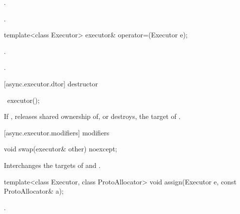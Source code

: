 \begin{itemdescr}
\pnum
\effects {}.

\pnum
\returns {}.
\end{itemdescr}

%
\begin{itemdecl}
template<class Executor> executor& operator=(Executor e);
\end{itemdecl}

\begin{itemdescr}
\pnum
\effects {}.

\pnum
\returns {}.
\end{itemdescr}



[async.executor.dtor]{ destructor}

%
\begin{itemdecl}
~executor();
\end{itemdecl}

\begin{itemdescr}
\pnum
\effects If , releases shared ownership of, or destroys, the target of .
\end{itemdescr}



[async.executor.modifiers]{ modifiers}

%
\begin{itemdecl}
void swap(executor& other) noexcept;
\end{itemdecl}

\begin{itemdescr}
\pnum
\effects Interchanges the targets of  and .
\end{itemdescr}

%
\begin{itemdecl}
template<class Executor, class ProtoAllocator>
  void assign(Executor e, const ProtoAllocator& a);
\end{itemdecl}

\begin{itemdescr}
\pnum
\effects {}.
\end{itemdescr}



